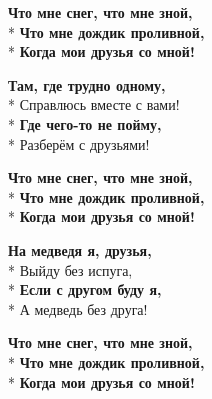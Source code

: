 \medskip

\begin{minipage}{\linewidth}
\hspace*{1.5em}\textbf{Что мне снег, что мне зной,}\\*
\hspace*{1.5em}\textbf{Что мне дождик проливной,}\\*
\hspace*{1.5em}\textbf{Когда мои друзья со мной!}\\
\end{minipage}\par\medskip\nobreak

\medskip

\begin{minipage}{\linewidth}
\textbf{Там, где трудно одному,}\\*
Справлюсь вместе с вами!\\*
\textbf{Где чего-то не пойму,}\\*
Разберём с друзьями!\\
\end{minipage}\par\medskip\nobreak

\medskip

\begin{minipage}{\linewidth}
\hspace*{1.5em}\textbf{Что мне снег, что мне зной,}\\*
\hspace*{1.5em}\textbf{Что мне дождик проливной,}\\*
\hspace*{1.5em}\textbf{Когда мои друзья со мной!}\\
\end{minipage}\par\medskip\nobreak

\medskip

\begin{minipage}{\linewidth}
\textbf{На медведя я, друзья,}\\*
Выйду без испуга,\\*
\textbf{Если с другом буду я,}\\*
А медведь без друга!\\
\end{minipage}\par\medskip\nobreak

\medskip

\begin{minipage}{\linewidth}
\hspace*{1.5em}\textbf{Что мне снег, что мне зной,}\\*
\hspace*{1.5em}\textbf{Что мне дождик проливной,}\\*
\hspace*{1.5em}\textbf{Когда мои друзья со мной!}\\
\end{minipage}\par\medskip\nobreak


